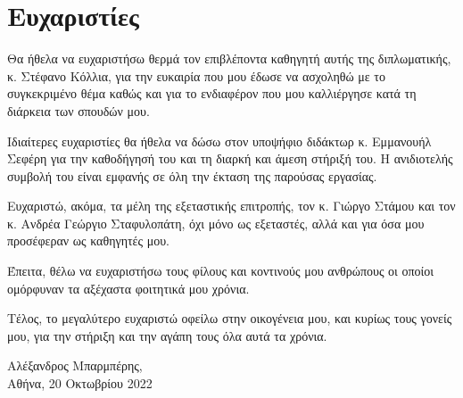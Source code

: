 \chapter*{Ευχαριστίες}

Θα ήθελα να ευχαριστήσω θερμά τον επιβλέποντα καθηγητή αυτής της διπλωματικής, κ. Στέφανο Κόλλια, για την ευκαιρία που μου έδωσε να ασχοληθώ με το συγκεκριμένο θέμα καθώς και για το ενδιαφέρον που μου καλλιέργησε κατά τη διάρκεια των σπουδών μου.\par

Ιδιαίτερες ευχαριστίες θα ήθελα να δώσω στον υποψήφιο διδάκτωρ κ. Εμμανουήλ Σεφέρη για την καθοδήγησή του και τη διαρκή και άμεση στήριξή του. Η ανιδιοτελής συμβολή του είναι εμφανής σε όλη την έκταση της παρούσας εργασίας.\par

Ευχαριστώ, ακόμα, τα μέλη της εξεταστικής επιτροπής, τον κ. Γιώργο Στάμου και τον
κ. Ανδρέα Γεώργιο Σταφυλοπάτη, όχι μόνο ως εξεταστές, αλλά και για όσα μου προσέφεραν ως καθηγητές
μου.\par

Έπειτα, θέλω να ευχαριστήσω τους φίλους και κοντινούς μου ανθρώπους οι οποίοι ομόρφυναν τα
αξέχαστα φοιτητικά μου χρόνια.\par

Τέλος, το μεγαλύτερο ευχαριστώ οφείλω στην οικογένεια μου, και κυρίως τους γονείς μου, για την στήριξη και την αγάπη τους όλα αυτά τα χρόνια.
\begin{flushright}
    Αλέξανδρος Μπαρμπέρης,\\
    Αθήνα, 20 Οκτωβρίου 2022
\end{flushright}
